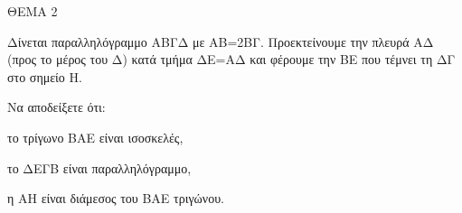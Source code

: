 
ΘΕΜΑ 2

Δίνεται παραλληλόγραμμο ΑΒΓΔ με ΑΒ=2ΒΓ. Προεκτείνουμε την πλευρά ΑΔ (προς το μέρος του Δ) κατά τμήμα ΔΕ=ΑΔ και φέρουμε την ΒΕ που τέμνει τη ΔΓ στο σημείο Η.

Να αποδείξετε ότι:

\begin{alist}
\item το τρίγωνο ΒΑΕ είναι ισοσκελές, 

\item το ΔΕΓΒ είναι παραλληλόγραμμο, 

\item η ΑΗ είναι διάμεσος του ΒΑΕ τριγώνου. 
\end{alist}
